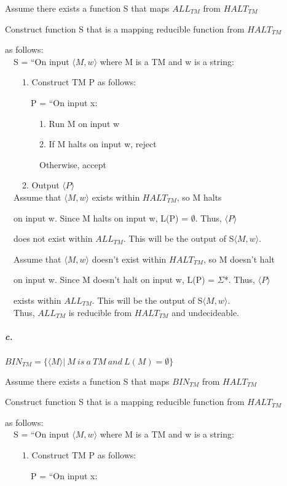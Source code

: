\documentclass[12pt]{article}
\begin{document}
Assume there exists a function S that maps $ALL_{TM}$ from $HALT_{TM}$

Construct function S that is a mapping reducible function from $HALT_{TM}$

 as follows:\\[.15in]
$\quad$S = ``On input $\langle M, w\rangle$ where M is a TM and w is a string:

$\quad\quad$1. Construct TM P as follows:

$\quad\quad\quad$P = ``On input x:

$\quad\quad\quad\quad$1. Run M on input w

$\quad\quad\quad\quad$2. If M halts on input w, reject

$\quad\quad\quad\quad$Otherwise, accept

$\quad\quad$2. Output $\langle P\rangle$\\[.04in]

$\quad$Assume that $\langle M, w\rangle$ exists within $HALT_{TM}$, so M halts

$\quad$on input w. Since M halts on input w, L(P) = $\emptyset$. Thus, $\langle P\rangle$

$\quad$does not exist within $ALL_{TM}$. This will be the output of S$\langle M, w\rangle$.

$\quad$Assume that $\langle M, w\rangle$ doesn't exist within $HALT_{TM}$, so M doesn't halt

$\quad$on input w. Since M doesn't halt on input w, L(P) = $\Sigma$*. Thus, $\langle P\rangle$

$\quad$exists within $ALL_{TM}$. This will be the output of S$\langle M, w\rangle$.\\[.04in]

$\quad$Thus, $ALL_{TM}$ is reducible from $HALT_{TM}$ and undecideable.

\subparagraph{c.}
$BIN_{TM} = \{\langle M\rangle |\ M\ is\ a\ TM\ and\ L(M) = \emptyset\}$

Assume there exists a function S that maps $BIN_{TM}$ from $HALT_{TM}$

Construct function S that is a mapping reducible function from $HALT_{TM}$

 as follows:\\[.15in]
$\quad$S = ``On input $\langle M, w\rangle$ where M is a TM and w is a string:

$\quad\quad$1. Construct TM P as follows:

$\quad\quad\quad$P = ``On input x:
\end{document}
